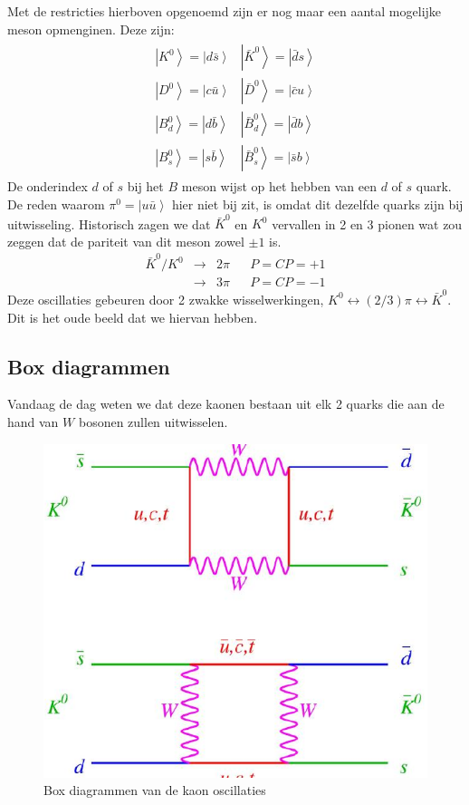 \documentclass[../main.tex]{subfiles}
\begin{document}
Met de restricties hierboven opgenoemd zijn er nog maar een aantal mogelijke meson opmenginen. Deze zijn:
\begin{equation}
    \begin{aligned}
        \label{eq:mogelijke_meson_opmengingen}
        \begin{array}{ll}
            \left|K^{0}\right>=\left| d \bar{s}\right> & \left|\bar{K}^{0}\right>=\left| \bar{d} s\right> \\
            \left|D^{0}\right>=\left| c \bar{u}\right> & \left|\bar{D}^{0}\right>=\left| \bar{c} u\right> \\
            \left|B_{d}^{0}\right>=\left| d \bar{b}\right> & \left|\bar{B}_{d}^{0}\right>=\left| \bar{d} b\right> \\
            \left|B_{s}^{0}\right>=\left| s \bar{b}\right> & \left|\bar{B}_{s}^{0}\right>=\left| \bar{s} b\right>
        \end{array}
    \end{aligned}
\end{equation}
De onderindex $d$ of $s$ bij het $B$ meson wijst op het hebben van een $d$ of $s$ quark. De reden waarom $\pi^0=\left|u\bar{u}\right>$ hier niet bij zit, is omdat dit dezelfde quarks zijn bij uitwisseling. Historisch zagen we dat $\bar{K}^{0}$ en $K^{0}$ vervallen in 2 en 3 pionen wat zou zeggen dat de pariteit van dit meson zowel $\pm1$ is.
\begin{equation}
    \begin{aligned}
        \label{eq:kaon_pion_verval}
            \bar{K}^{0} / K^{0} & \rightarrow & 2 \pi & & P=C P=+1 \\
                                & \rightarrow & 3 \pi & & P=C P=-1
    \end{aligned}
\end{equation}
Deze oscillaties gebeuren door 2 zwakke wisselwerkingen, $K^{0} \leftrightarrow(2 / 3) \pi \leftrightarrow \bar{K}^{0}$. Dit is het oude beeld dat we hiervan hebben.

\subsection{Box diagrammen}%
\label{sub:box_diagrammen}

Vandaag de dag weten we dat deze kaonen bestaan uit elk 2 quarks die aan de hand van $W$ bosonen zullen uitwisselen.

\begin{figure}[h]
    \centering
    \includegraphics[width=0.4\linewidth]{meson_mixing_and_oscillations/box_diagrams.png}
    \caption{Box diagrammen van de kaon oscillaties}%
    \label{fig:meson_mixing_and_oscillations/box_diagrams}
\end{figure}
\end{document}
